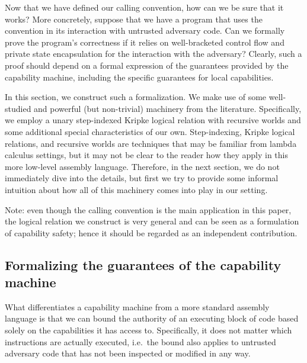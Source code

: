\documentclass[format=acmsmall, review=true, screen=true]{acmart}
\newenvironment{toplas}%
    {\color{OliveGreen}}{}
\begin{document}
\begin{toplas}
Now that we have defined our calling convention, how can we be sure that it
works? More concretely, suppose that we have a program that uses the convention
in its interaction with untrusted adversary code. Can we formally prove the
program's correctness if it relies on well-bracketed control flow and private
state encapsulation for the interaction with the adversary? Clearly, such a
proof should depend on a formal expression of the guarantees provided by the
capability machine, including the specific guarantees for local capabilities.

In this section, we construct such a formalization. We make use of some
well-studied and powerful (but non-trivial) machinery from the literature.
Specifically, we employ a unary step-indexed Kripke logical relation with
recursive worlds and some additional special characteristics of our own.
Step-indexing, Kripke logical relations, and recursive worlds are techniques that
may be familiar from lambda calculus settings, but it may not be clear to the
reader how they apply in this more low-level assembly language. Therefore, in the next section, we do
not immediately dive into the details, but first we try to provide some informal
intuition about how all of this machinery comes into play in our setting.

Note: even though the calling convention is the main application in this paper,
the logical relation we construct is very general and can be seen as a
formulation of capability safety; hence it should be regarded as an
independent contribution.

\subsection{Formalizing the guarantees of the capability machine}
\label{sec:formalizing-guarantees}
What differentiates a capability machine from a more standard assembly language
is that we can bound the authority of an executing block of code based solely
on the capabilities it has access to. Specifically, it does not matter which
instructions are actually executed, i.e.\ the bound also applies to untrusted
adversary code that has not been inspected or modified in any way.


\end{toplas}
\end{document}
